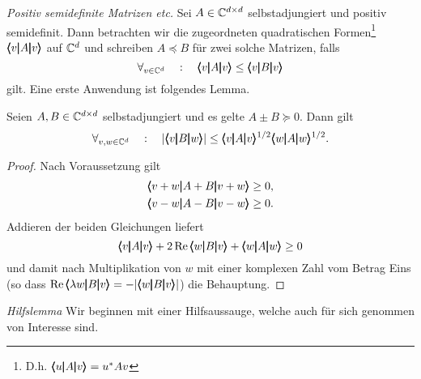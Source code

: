 \medskip\noindent
{\em Positiv semidefinite Matrizen etc.}
Sei $A\in\mathbb C^{d\times d}$ selbstadjungiert und positiv semidefinit. Dann betrachten wir die zugeordneten quadratischen Formen\footnote{D.h. $\pmb\langle u\pmb|A\pmb|v\pmb\rangle = u^* A v$} $\pmb\langle v\pmb|A\pmb|v\pmb\rangle$ auf $\mathbb C^d$ und  schreiben $A \preceq B$ für zwei solche Matrizen, falls 
\begin{equation}
   \forall_{v\in\mathbb C^d} \quad:\quad \pmb\langle v\pmb|A\pmb|v\pmb\rangle\le \pmb\langle v\pmb|B\pmb|v\pmb\rangle
\end{equation}
gilt. Eine erste Anwendung ist folgendes Lemma.

\begin{lem}\label{Matrizenlemma}
	Seien $A,B\in\mathbb C^{d\times d}$ selbstadjungiert und es gelte $A\pm B \succeq 0$. Dann gilt
	\begin{equation}
		\forall_{v,w \in \mathbb{C}^d} \quad: \quad \vert \pmb\langle v\pmb|B\pmb|w\pmb\rangle \vert \le \pmb\langle v\pmb|A\pmb|v\pmb\rangle^{{1}/{2}}\pmb\langle w\pmb|A\pmb|w\pmb\rangle^{{1}/{2}}. 
	\end{equation}
\end{lem}
\begin{proof}
	Nach Voraussetzung gilt
	\begin{equation}\begin{split}
		&\pmb\langle v+w\pmb|A+B\pmb|v+w\pmb\rangle \ge 0,\\
		&\pmb\langle v-w\pmb|A-B\pmb|v-w\pmb\rangle \ge 0.
		\end{split}
	\end{equation}
	Addieren der beiden Gleichungen liefert
	\begin{equation}
		\pmb\langle v\pmb|A\pmb|v\pmb\rangle+2\operatorname{Re} \pmb\langle w\pmb|B\pmb|v\pmb\rangle +\pmb\langle w\pmb|A\pmb|w\pmb\rangle \ge 0
	\end{equation}
	und damit nach Multiplikation von $w$ mit einer komplexen Zahl vom Betrag Eins (so dass $\operatorname{Re} \pmb\langle\lambda w\pmb|B\pmb|v\pmb\rangle = - | \pmb\langle w\pmb|B\pmb|v\pmb\rangle|$) die Behauptung. 
\end{proof}

\medskip\noindent
{\em Hilfslemma} Wir beginnen mit einer Hilfsaussauge, welche auch für sich genommen von Interesse sind. 

